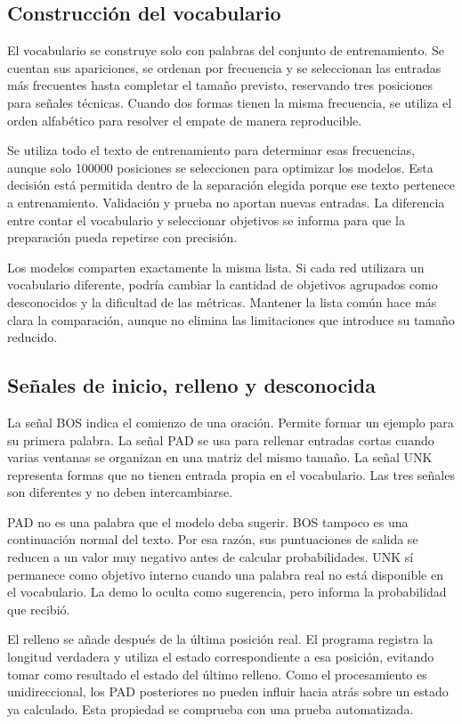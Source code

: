 \subsection{Construcción del vocabulario}
El vocabulario se construye solo con palabras del conjunto de entrenamiento. Se cuentan sus apariciones, se ordenan por frecuencia y se seleccionan las entradas más frecuentes hasta completar el tamaño previsto, reservando tres posiciones para señales técnicas. Cuando dos formas tienen la misma frecuencia, se utiliza el orden alfabético para resolver el empate de manera reproducible.

Se utiliza todo el texto de entrenamiento para determinar esas frecuencias, aunque solo 100000 posiciones se seleccionen para optimizar los modelos. Esta decisión está permitida dentro de la separación elegida porque ese texto pertenece a entrenamiento. Validación y prueba no aportan nuevas entradas. La diferencia entre contar el vocabulario y seleccionar objetivos se informa para que la preparación pueda repetirse con precisión.

Los modelos comparten exactamente la misma lista. Si cada red utilizara un vocabulario diferente, podría cambiar la cantidad de objetivos agrupados como desconocidos y la dificultad de las métricas. Mantener la lista común hace más clara la comparación, aunque no elimina las limitaciones que introduce su tamaño reducido.

\subsection{Señales de inicio, relleno y desconocida}
La señal BOS indica el comienzo de una oración. Permite formar un ejemplo para su primera palabra. La señal PAD se usa para rellenar entradas cortas cuando varias ventanas se organizan en una matriz del mismo tamaño. La señal UNK representa formas que no tienen entrada propia en el vocabulario. Las tres señales son diferentes y no deben intercambiarse.

PAD no es una palabra que el modelo deba sugerir. BOS tampoco es una continuación normal del texto. Por esa razón, sus puntuaciones de salida se reducen a un valor muy negativo antes de calcular probabilidades. UNK sí permanece como objetivo interno cuando una palabra real no está disponible en el vocabulario. La demo lo oculta como sugerencia, pero informa la probabilidad que recibió.

El relleno se añade después de la última posición real. El programa registra la longitud verdadera y utiliza el estado correspondiente a esa posición, evitando tomar como resultado el estado del último relleno. Como el procesamiento es unidireccional, los PAD posteriores no pueden influir hacia atrás sobre un estado ya calculado. Esta propiedad se comprueba con una prueba automatizada.

